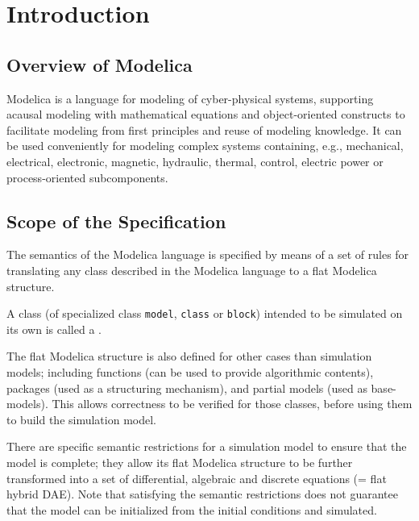 \chapter{Introduction}\label{introduction1}

\section{Overview of Modelica}\label{overview-of-modelica}

Modelica is a language for modeling of cyber-physical systems, supporting acausal modeling with mathematical equations and object-oriented constructs to facilitate modeling from first principles and reuse of modeling knowledge.
It can be used conveniently for modeling complex systems containing, e.g., mechanical, electrical, electronic, magnetic, hydraulic, thermal, control, electric power or process-oriented subcomponents.

\section{Scope of the Specification}\label{scope-of-the-specification}

The semantics of the Modelica language is specified by means of a set of rules for translating any class described in the Modelica language to a flat Modelica structure.

A class (of specialized class \lstinline!model!, \lstinline!class! or \lstinline!block!) intended to be simulated on its own is called a .

The flat Modelica structure is also defined for other cases than simulation models; including functions (can be used to provide algorithmic contents), packages (used as a structuring mechanism), and partial models (used as base-models).
This allows correctness to be verified for those classes, before using them to build the simulation model.

There are specific semantic restrictions for a simulation model to ensure that the model is complete; they allow its flat Modelica structure to be further transformed into a set of differential, algebraic and discrete equations (= flat hybrid DAE).
Note that satisfying the semantic restrictions does not guarantee that the model can be initialized from the initial conditions and simulated.

